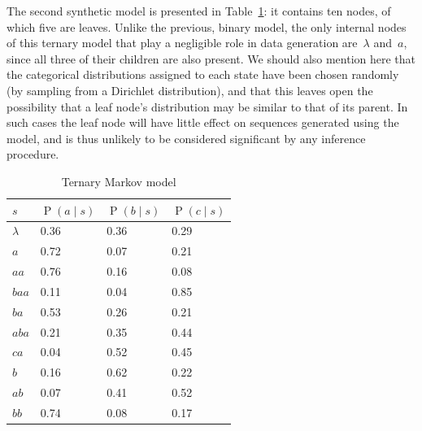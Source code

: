 \documentclass[12pt,a4paper]{article}
\DeclareMathOperator\Pb{P}                    %
\begin{document}
The second synthetic model is presented in Table~\ref{tab:ternary model}: it
contains ten nodes, of which five are leaves. Unlike the previous, binary model,
the only internal nodes of this ternary model that play a negligible role in
data generation are~\(\lambda\) and~\(a\), since all three of their children are
also present. We should also mention here that the categorical distributions
assigned to each state have been chosen randomly (by sampling from a Dirichlet
distribution), and that this leaves open the possibility that a leaf node's
distribution may be similar to that of its parent. In such cases the leaf node
will have little effect on sequences generated using the model, and is thus
unlikely to be considered significant by any inference procedure.
%
\begin{table}[htbp]
  \centering
  \begin{tabular}{llll}
    \toprule
    \(s\)       & \(\Pb(a \mid s)\) & \(\Pb(b \mid s)\) & \(\Pb(c \mid s)\) \\
    \midrule
    \(\lambda\) & 0.36 & 0.36 & 0.29 \\
    \(a\)       & 0.72 & 0.07 & 0.21 \\
    \(aa\)      & 0.76 & 0.16 & 0.08 \\
    \(baa\)     & 0.11 & 0.04 & 0.85 \\
    \(ba\)      & 0.53 & 0.26 & 0.21 \\
    \(aba\)     & 0.21 & 0.35 & 0.44 \\
    \(ca\)      & 0.04 & 0.52 & 0.45 \\
    \(b\)       & 0.16 & 0.62 & 0.22 \\
    \(ab\)      & 0.07 & 0.41 & 0.52 \\
    \(bb\)      & 0.74 & 0.08 & 0.17 \\
    \bottomrule
  \end{tabular}
  \caption{Ternary Markov model}\label{tab:ternary model}
  \end{table}
\end{document}
